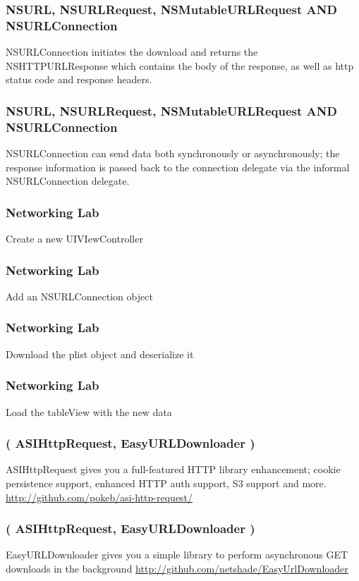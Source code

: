 \documentclass[10pt]{beamer}
\begin{document}
\begin{frame}[fragile]
  \frametitle{NSURL, NSURLRequest,  NSMutableURLRequest AND NSURLConnection}
  NSURLConnection initiates the download and returns the NSHTTPURLResponse which contains the body of the response, as well as http status code and response headers.

\end{frame}

\begin{frame}[fragile]
  \frametitle{NSURL, NSURLRequest,  NSMutableURLRequest AND NSURLConnection}
  NSURLConnection can send data both synchronously or asynchronously; the response information is passed back to the connection delegate via the informal NSURLConnection delegate.

\end{frame}

    
\begin{frame}[fragile]
  \frametitle{Networking Lab}
  Create a new UIVIewController

\end{frame}

\begin{frame}[fragile]
  \frametitle{Networking Lab}
  Add an NSURLConnection object

\end{frame}

\begin{frame}[fragile]
  \frametitle{Networking Lab}
  Download the plist object and deserialize it

\end{frame}

\begin{frame}[fragile]
  \frametitle{Networking Lab}
  Load the tableView with the new data

\end{frame}

    
\begin{frame}[fragile]
  \frametitle{( ASIHttpRequest, EasyURLDownloader )}
  ASIHttpRequest gives you a full-featured HTTP library enhancement; cookie persistence support, enhanced HTTP auth support, S3 support and more. \url{http://github.com/pokeb/asi-http-request/}

\end{frame}

\begin{frame}[fragile]
  \frametitle{( ASIHttpRequest, EasyURLDownloader )}
  EasyURLDownloader gives you a simple library to perform asynchronous GET downloads in the background \url{http://github.com/netshade/EasyUrlDownloader}

\end{frame}
\end{document}
